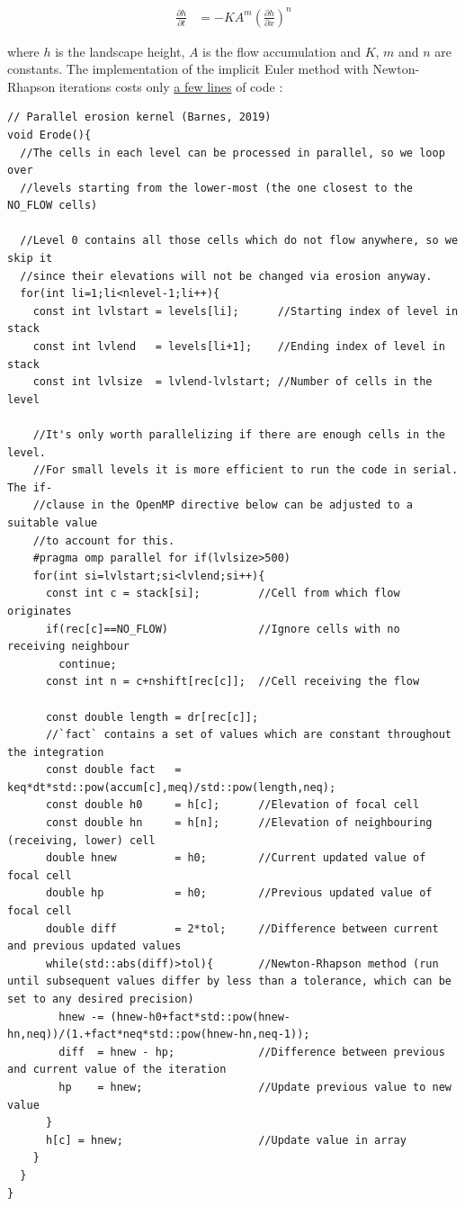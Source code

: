 \documentclass[a4paper]{article} %
\begin{document}
\begin{align}
    \frac{\partial h}{\partial t} &= -KA^m\left(\frac{\partial h}{\partial x}\right)^n
\end{align}

where $h$ is the landscape height, $A$ is the flow accumulation and $K$, $m$ and
$n$ are constants. The implementation of the implicit Euler method with
Newton-Rhapson iterations costs only \href{https://github.com/r-barnes/Barnes2019-Landscape/blob/2274e4639ab2299701d306fe42f24380a7845795/fastscape_RB%2BP.cpp#L313}{a few lines} of code \cite{barnesAcceleratingFluvialIncision2019}:

\begin{verbatim}
// Parallel erosion kernel (Barnes, 2019)
void Erode(){
  //The cells in each level can be processed in parallel, so we loop over
  //levels starting from the lower-most (the one closest to the NO_FLOW cells)

  //Level 0 contains all those cells which do not flow anywhere, so we skip it
  //since their elevations will not be changed via erosion anyway.
  for(int li=1;li<nlevel-1;li++){
    const int lvlstart = levels[li];      //Starting index of level in stack
    const int lvlend   = levels[li+1];    //Ending index of level in stack
    const int lvlsize  = lvlend-lvlstart; //Number of cells in the level

    //It's only worth parallelizing if there are enough cells in the level.
    //For small levels it is more efficient to run the code in serial. The if-
    //clause in the OpenMP directive below can be adjusted to a suitable value
    //to account for this.
    #pragma omp parallel for if(lvlsize>500)
    for(int si=lvlstart;si<lvlend;si++){
      const int c = stack[si];         //Cell from which flow originates
      if(rec[c]==NO_FLOW)              //Ignore cells with no receiving neighbour
        continue;
      const int n = c+nshift[rec[c]];  //Cell receiving the flow

      const double length = dr[rec[c]];
      //`fact` contains a set of values which are constant throughout the integration
      const double fact   = keq*dt*std::pow(accum[c],meq)/std::pow(length,neq);
      const double h0     = h[c];      //Elevation of focal cell
      const double hn     = h[n];      //Elevation of neighbouring (receiving, lower) cell
      double hnew         = h0;        //Current updated value of focal cell
      double hp           = h0;        //Previous updated value of focal cell
      double diff         = 2*tol;     //Difference between current and previous updated values
      while(std::abs(diff)>tol){       //Newton-Rhapson method (run until subsequent values differ by less than a tolerance, which can be set to any desired precision)
        hnew -= (hnew-h0+fact*std::pow(hnew-hn,neq))/(1.+fact*neq*std::pow(hnew-hn,neq-1));
        diff  = hnew - hp;             //Difference between previous and current value of the iteration
        hp    = hnew;                  //Update previous value to new value
      }
      h[c] = hnew;                     //Update value in array
    }
  }
}
\end{verbatim}
\end{document}
